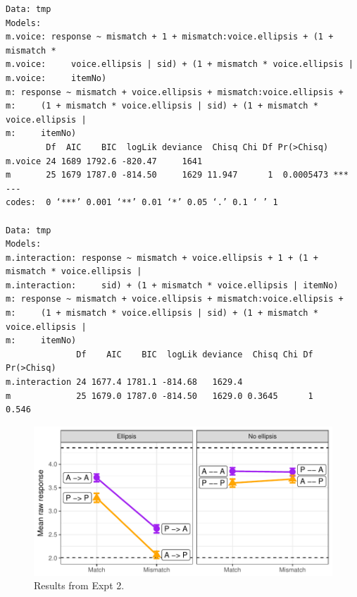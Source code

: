 \documentclass[11pt]{article}
\begin{document}
\begin{verbatim}
Data: tmp
Models:
m.voice: response ~ mismatch + 1 + mismatch:voice.ellipsis + (1 + mismatch * 
m.voice:     voice.ellipsis | sid) + (1 + mismatch * voice.ellipsis | 
m.voice:     itemNo)
m: response ~ mismatch + voice.ellipsis + mismatch:voice.ellipsis + 
m:     (1 + mismatch * voice.ellipsis | sid) + (1 + mismatch * voice.ellipsis | 
m:     itemNo)
        Df  AIC    BIC  logLik deviance  Chisq Chi Df Pr(>Chisq)    
m.voice 24 1689 1792.6 -820.47     1641                             
m       25 1679 1787.0 -814.50     1629 11.947      1  0.0005473 ***
---
codes:  0 ‘***’ 0.001 ‘**’ 0.01 ‘*’ 0.05 ‘.’ 0.1 ‘ ’ 1

Data: tmp
Models:
m.interaction: response ~ mismatch + voice.ellipsis + 1 + (1 + mismatch * voice.ellipsis | 
m.interaction:     sid) + (1 + mismatch * voice.ellipsis | itemNo)
m: response ~ mismatch + voice.ellipsis + mismatch:voice.ellipsis + 
m:     (1 + mismatch * voice.ellipsis | sid) + (1 + mismatch * voice.ellipsis | 
m:     itemNo)
              Df    AIC    BIC  logLik deviance  Chisq Chi Df Pr(>Chisq)
m.interaction 24 1677.4 1781.1 -814.68   1629.4                         
m             25 1679.0 1787.0 -814.50   1629.0 0.3645      1      0.546
\end{verbatim}

\begin{figure}[htbp]
\centering
\includegraphics[width=.9\linewidth]{img/expt-02-graph.pdf}
\caption{Results from Expt 2.}
\end{figure}
\end{document}
